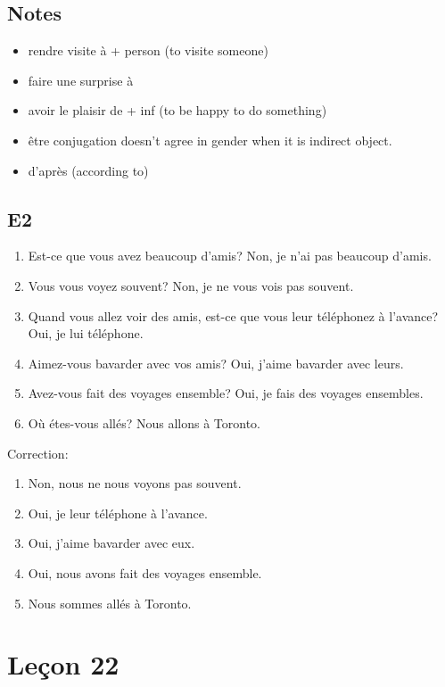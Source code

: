\documentclass{book}
\begin{document}
    \section{Notes}
        \begin{itemize}
            \item rendre visite à + person (to visite someone)
            \item faire une surprise à 
            \item avoir le plaisir de + inf (to be happy to do something)
            \item être conjugation doesn't agree in gender when it is indirect object.
            \item d'après (according to)
        \end{itemize}

    \section{E2}
        \begin{enumerate}
            \item Est-ce que vous avez beaucoup d'amis? Non, je n'ai pas beaucoup d'amis.
            \item Vous vous voyez souvent? Non, je ne vous vois pas souvent.
            \item Quand vous allez voir des amis, est-ce que vous leur téléphonez à l'avance? Oui, je lui téléphone.
            \item Aimez-vous bavarder avec vos amis? Oui, j'aime bavarder avec leurs.
            \item Avez-vous fait des voyages ensemble? Oui, je fais des voyages ensembles.
            \item Où étes-vous allés? Nous allons à Toronto.
        \end{enumerate}
        Correction:
        \begin{enumerate}
            \item Non, nous ne nous voyons pas souvent.
            \item Oui, je leur téléphone à l'avance.
            \item Oui, j'aime bavarder avec eux.
            \item Oui, nous avons fait des voyages ensemble.
            \item Nous sommes allés à Toronto.
        \end{enumerate}

\chapter{Leçon 22}
\end{document}
